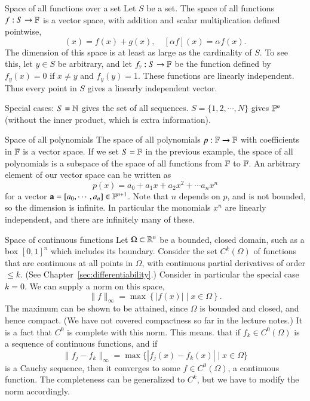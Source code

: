 \begin{myExample}{Space of all functions over a set}{}
    Let $S$ be a set. The space of all functions $f : S \to \mathbb{F}$ is a vector space, with addition and scalar multiplication defined pointwise,
    \begin{equation}
        [f + g](x) = f(x) + g(x), \quad [\alpha f](x) = \alpha f(x).
    \end{equation}
    The dimension of this space is at least as large as the cardinality of $S$. To see this, let $y \in S$ be arbitrary, and let $f_y : S \to \mathbb{F}$ be the function defined by $f_y(x) = 0$ if $x\neq y$ and $f_y(y)=1$. These functions are linearly independent. Thus every point in $S$ gives a linearly independent vector.
    
    Special cases: $S = \mathbb{N}$ gives the set of all sequences. $S = \{1,2,\cdots,N\}$ gives $\mathbb{F}^n$ (without the inner product, which is extra information).
\end{myExample}

\begin{myExample}{Space of all polynomials}{}
    The space of all polynomials $p : \mathbb{F}\to\mathbb{F}$ with coefficients in $\mathbb{F}$ is a vector space. If we set $S = \mathbb{F}$ in the previous example, the space of all polynomials is a subspace of the space of all functions from $\mathbb{F}$ to $\mathbb{F}$. An arbitrary element of our vector space can be written as
    \[ p(x) = a_0 + a_1 x + a_2 x^2 + \cdots a_n x^n \]
    for a vector $\mathbf{a} = [a_0, \cdots, a_n] \in \mathbb{F}^{n+1}$. Note that $n$ depends on $p$, and is not bounded, so the dimension is infinite. In particular the monomials $x^n$ are linearly independent, and there are infinitely many of these. 
\end{myExample}

\begin{myExample}{Space of continuous functions}{}
Let $\Omega \subset \mathbb{R}^n$ be a bounded, closed domain, such as a box $[0,1]^n$ which includes its boundary. Consider  the set $C^k(\Omega)$ of functions that are continuous at all points in $\Omega$, with continuous partial derivatives of order $\leq k$. (See Chapter~\ref{sec:differentiability}.) Consider in particular the special case $k=0$. We can supply a norm on this space,
\begin{equation}
\|f\|_\infty = \max \left\{ |f(x)| \mid x \in \Omega \right\}.
\end{equation}
The maximum can be shown to be attained, since $\Omega$ is bounded and closed, and hence compact. (We have not covered compactness so far in the lecture notes.) It is a fact that $C^0$ is complete with this norm. This means. that if $f_k \in C^0(\Omega)$ is a sequence of continuous functions, and if
\begin{equation}
    \|f_j - f_k\|_\infty =\max\{ |f_j(x)-f_k(x)| \mid x \in \Omega \}
\end{equation}
is a Cauchy sequence, then it converges to some $f\in C^0(\Omega)$, a continuous function. The completeness can be generalized to $C^k$, but we have to modify the norm accordingly.
\end{myExample}

